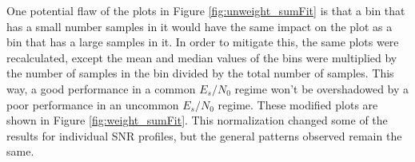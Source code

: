 \par One potential flaw of the plots in Figure \ref{fig:unweight_sumFit} is that a bin that has a small number samples in it would have the same impact on the plot as a bin that has a large samples in it. In order to mitigate this, the same plots were recalculated, except the mean and median values of the bins were multiplied by the number of samples in the bin divided by the total number of samples. This way, a good performance in a common $E_s/N_0$ regime won't be overshadowed by a poor performance in an uncommon $E_s/N_0$ regime. These modified plots are shown in Figure \ref{fig:weight_sumFit}. This normalization changed some of the results for individual SNR profiles, but the general patterns observed remain the same.
\begin{figure}[ht!]


\end{figure}
